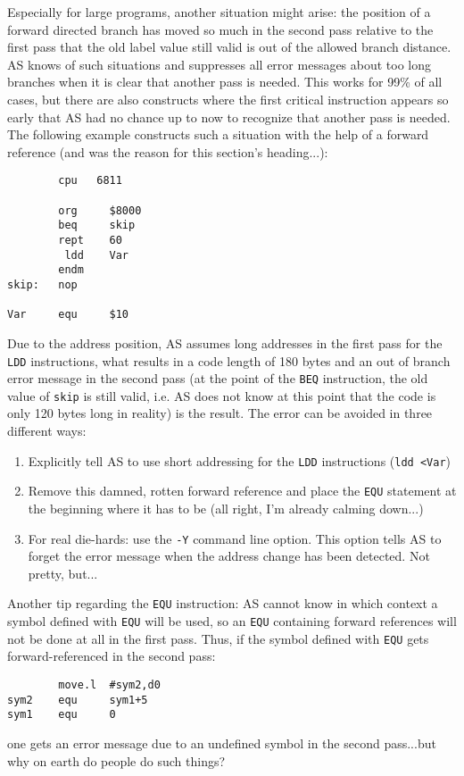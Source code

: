 \documentclass[12pt,twoside]{report}
\newcommand{\tty}[1]{{\tt #1}}
\newcommand{\asname}{{AS}}
\begin{document}
Especially for large programs, another situation might arise: the
position of a forward directed branch has moved so much in the second
pass relative to the first pass that the old label value still valid
is out of the allowed branch distance.  \asname{} knows of such situations
and suppresses all error messages about too long branches when it is
clear that another pass is needed.  This works for 99\% of all cases,
but there are also constructs where the first critical instruction
appears so early that \asname{} had no chance up to now to recognize that
another pass is needed.  The following example constructs such a
situation with the help of a forward reference (and was the reason
for this section's heading...):
\begin{verbatim}
        cpu   6811

        org     $8000
        beq     skip
        rept    60
         ldd    Var
        endm
skip:   nop

Var     equ     $10
\end{verbatim}
Due to the address position, \asname{} assumes long addresses in the first
pass for the \tty{LDD} instructions, what results in a code length of 180
bytes and an out of branch error message in the second pass (at the
point of the \tty{BEQ} instruction, the old value of \tty{skip} is still valid,
i.e. \asname{} does not know at this point that the code is only 120 bytes
long in reality) is the result.  The error can be avoided in three
different ways:
\begin{enumerate}
\item{Explicitly tell \asname{} to use short addressing for the \tty{LDD}
      instructions (\tty{ldd <Var})}
\item{Remove this damned, rotten forward reference and place the \tty{EQU}
      statement at the beginning where it has to be (all right, I'm
      already calming down...)}
\item{For real die-hards: use the \tty{-Y} command line option.  This
      option tells \asname{} to forget the error message when the address
      change has been detected.  Not pretty, but...}
\end{enumerate}
Another tip regarding the \tty{EQU} instruction: \asname{} cannot know in which
context a symbol defined with \tty{EQU} will be used, so an \tty{EQU} containing
forward references will not be done at all in the first pass.  Thus,
if the symbol defined with \tty{EQU} gets forward-referenced in the second
pass:
\begin{verbatim}
        move.l  #sym2,d0
sym2    equ     sym1+5
sym1    equ     0
\end{verbatim}
one gets an error message due to an undefined symbol in the second
pass...but why on earth do people do such things?
\end{document}
